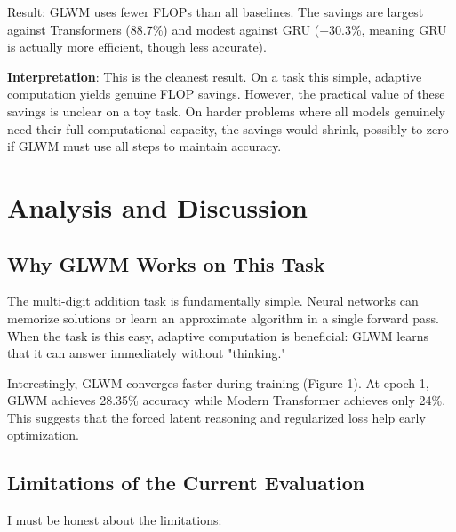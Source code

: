 \documentclass[11pt]{article}
\begin{document}
Result: GLWM uses fewer FLOPs than all baselines. The savings are largest against Transformers (88.7\%) and modest against GRU (−30.3\%, meaning GRU is actually more efficient, though less accurate).

\textbf{Interpretation}: This is the cleanest result. On a task this simple, adaptive computation yields genuine FLOP savings. However, the practical value of these savings is unclear on a toy task. On harder problems where all models genuinely need their full computational capacity, the savings would shrink, possibly to zero if GLWM must use all steps to maintain accuracy.

\section{Analysis and Discussion}

\subsection{Why GLWM Works on This Task}

The multi-digit addition task is fundamentally simple. Neural networks can memorize solutions or learn an approximate algorithm in a single forward pass. When the task is this easy, adaptive computation is beneficial: GLWM learns that it can answer immediately without "thinking."

Interestingly, GLWM converges faster during training (Figure 1). At epoch 1, GLWM achieves 28.35\% accuracy while Modern Transformer achieves only 24\%. This suggests that the forced latent reasoning and regularized loss help early optimization.

\subsection{Limitations of the Current Evaluation}

I must be honest about the limitations:
\end{document}
